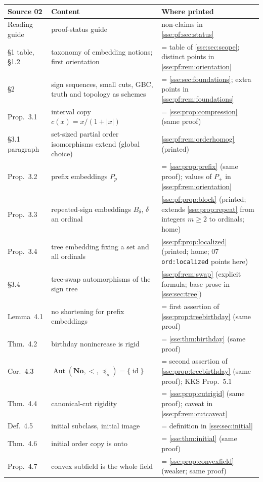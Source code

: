 \documentclass[11pt,a4paper]{article}
\numberwithin{equation}{section}
\theoremstyle{plain}
\theoremstyle{definition}
\theoremstyle{remark}
\newcommand{\No}{\mathbf{No}}
\newcommand{\id}{\operatorname{id}}
\newcommand{\pref}{\preccurlyeq_s}
\newcommand{\code}[1]{\texttt{\small #1}}
\newcommand{\Autpf}{\operatorname{Aut}}
\begin{document}
\begingroup\small
\begin{longtable}{P{27mm}P{50mm}P{71mm}}
\toprule
Source 02 & Content & Where printed \\
\midrule
\endhead
Reading guide & proof-status guide & non-claims in \cref{sse:pf:sec:status} \\
\S1 table, \S1.2 & taxonomy of embedding notions; first orientation & = table of \cref{sse:sec:scope}; distinct points in \cref{sse:pf:rem:orientation} \\
\S2 & sign sequences, small cuts, GBC, truth and topology as schemes & = \cref{sse:sec:foundations}; extra points in \cref{sse:pf:rem:foundations} \\
Prop.~3.1 & interval copy $c(x)=x/(1+|x|)$ & = \cref{sse:prop:compression} (same proof) \\
\S3.1 paragraph & set-sized partial order isomorphisms extend (global choice) & \cref{sse:pf:rem:orderhomog} (printed) \\
Prop.~3.2 & prefix embeddings $P_p$ & = \cref{sse:prop:prefix} (same proof); values of $P_+$ in \cref{sse:pf:rem:orientation} \\
Prop.~3.3 & repeated-sign embeddings $B_\delta$, $\delta$ an ordinal & \cref{sse:pf:prop:block} (printed; extends \cref{sse:prop:repeat} from integers $m\ge2$ to ordinals; home) \\
Prop.~3.4 & tree embedding fixing a set and all ordinals & \cref{sse:pf:prop:localized} (printed; home; 07 \code{ord:localized} points here) \\
\S3.4 & tree-swap automorphisms of the sign tree & \cref{sse:pf:rem:swap} (explicit formula; base prose in \cref{sse:sec:tree}) \\
Lemma~4.1 & no shortening for prefix embeddings & = first assertion of \cref{sse:prop:treebirthday} (same proof) \\
Thm.~4.2 & birthday nonincrease is rigid & = \cref{sse:thm:birthday} (same proof) \\
Cor.~4.3 & $\Autpf(\No,<,\pref)=\{\id\}$ & = second assertion of \cref{sse:prop:treebirthday} (same proof); KKS Prop.~5.1 \\
Thm.~4.4 & canonical-cut rigidity & = \cref{sse:prop:cutrigid} (same proof); caveat in \cref{sse:pf:rem:cutcaveat} \\
Def.~4.5 & initial subclass, initial image & = definition in \cref{sse:sec:initial} \\
Thm.~4.6 & initial order copy is onto & = \cref{sse:thm:initial} (same proof) \\
Prop.~4.7 & convex subfield is the whole field & = \cref{sse:prop:convexfield} (weaker; same proof) \\

\end{longtable}
\end{document}
